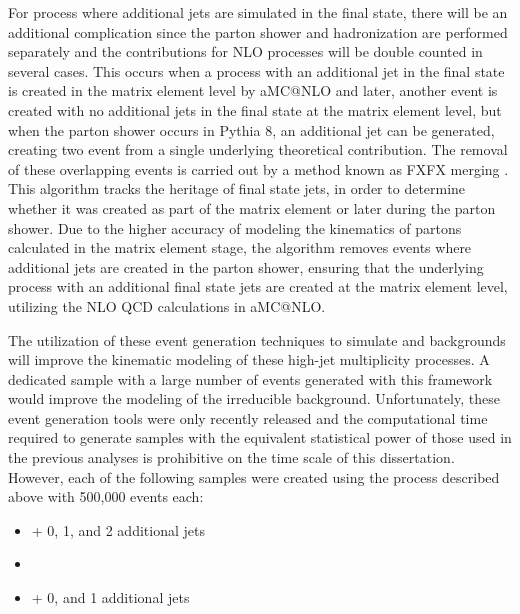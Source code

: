 \par For process where additional jets are simulated in the final
state, there will be an additional complication since the parton
shower and hadronization are performed separately and the
contributions for NLO processes will be double counted in several
cases.  This occurs when a process with an additional jet in the final
state is created in the matrix element level by aMC@NLO and later,
another event is created with no additional jets in the final state at
the matrix element level, but when the parton shower occurs in Pythia
8, an additional jet can be generated, creating two event from a
single underlying theoretical contribution.  The removal of these
overlapping events is carried out by a method known as FXFX
merging \cite{Frederix:2012ps}.  This algorithm tracks the heritage of
final state jets, in order to determine whether it was created as part
of the matrix element or later during the parton shower.  Due to the
higher accuracy of modeling the kinematics of partons calculated in
the matrix element stage, the algorithm removes events where
additional jets are created in the parton shower, ensuring that the
underlying process with an additional final state jets are created
at the matrix element level, utilizing the NLO QCD calculations in
aMC@NLO.  

\par The utilization of these event generation techniques to simulate
\ttH and \ttjets backgrounds will improve the kinematic modeling of
these high-jet multiplicity processes.  A dedicated \ttbb sample with
a large number of events generated with this framework would improve
the modeling of the irreducible background.  Unfortunately, these
event generation tools were only recently released and the
computational time required to generate samples with the equivalent
statistical power of those used in the previous analyses is
prohibitive on the time scale of this dissertation.  However, each of
the following samples were created using the process described above
with 500,000 events each: 

\begin{itemize}
  \item \ttbar + 0, 1, and 2 additional jets
  \item \ttbb
  \item \ttH + 0, and 1 additional jets
\end{itemize}

